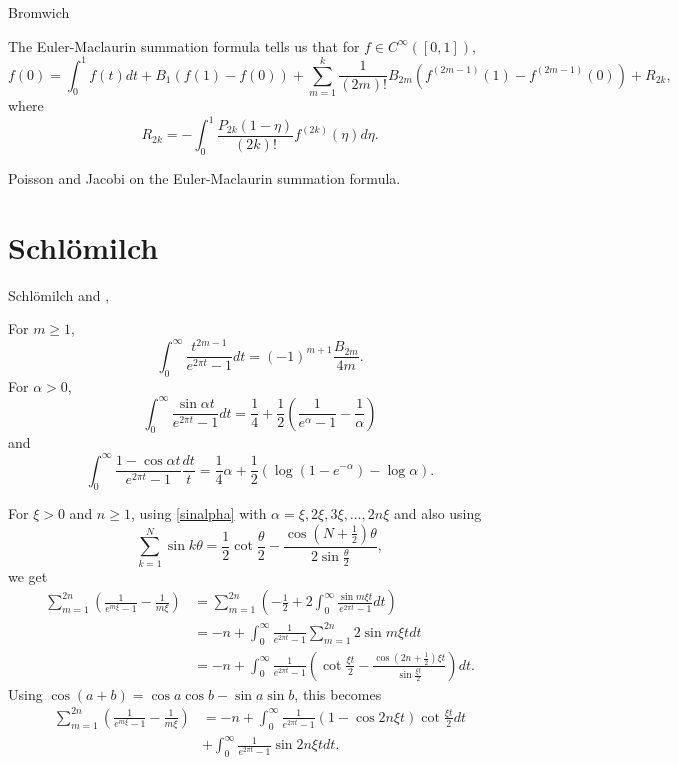 \documentclass{article}
\begin{document}
Bromwich \cite[Chapter~XII]{bromwich}

The Euler-Maclaurin summation formula \cite[p.~280, Ch.~VI, Eq.~35]{bourbaki} tells us that for $f \in C^\infty([0,1])$,
\[
f(0)=\int_0^1 f(t) dt
+B_1(f(1)-f(0))+
\sum_{m=1}^k \frac{1}{(2m)!} B_{2m} ( f^{(2m-1)}(1)-f^{(2m-1)}(0))+R_{2k},
\]
where 
\[
R_{2k} = -\int_0^1 \frac{P_{2k}(1-\eta)}{(2k)!} f^{(2k)}(\eta) d\eta.
\]

Poisson and Jacobi  on the Euler-Maclaurin summation formula.



\section{Schl\"omilch}
Schl\"omilch \cite{schlomilch1861}  and  \cite[p.~238]{compendium}, \cite{schlomilch1863}


For $m \geq 1$,
\begin{equation}
\int_0^\infty \frac{t^{2m-1}}{e^{2\pi t}-1} dt=(-1)^{m+1} \frac{B_{2m}}{4m}.
\label{bernoulliInt}
\end{equation}
For $\alpha>0$,
\begin{equation}
\int_0^\infty \frac{\sin \alpha t}{e^{2\pi t}-1} dt = \frac{1}{4}+\frac{1}{2}\left(\frac{1}{e^\alpha-1}-\frac{1}{\alpha}\right)
\label{sinalpha}
\end{equation}
and
\begin{equation}
\int_0^\infty \frac{1-\cos \alpha t}{e^{2\pi t}-1} \frac{dt}{t} = \frac{1}{4}\alpha+\frac{1}{2}\left(\log(1-e^{-\alpha})-\log \alpha\right).
\label{cosalpha}
\end{equation}

For $\xi>0$ and $n \geq 1$, using \eqref{sinalpha} with $\alpha=\xi,2\xi,3\xi,\ldots,2n\xi$ 
and also using
\[
\sum_{k=1}^N \sin k\theta = \frac{1}{2}\cot \frac{\theta}{2}-\frac{\cos(N+\frac{1}{2})\theta}{2\sin \frac{\theta}{2}},
\]
we get
\begin{align*}
\sum_{m=1}^{2n} \left(\frac{1}{e^{m\xi}-1} -\frac{1}{m\xi} \right)&=\sum_{m=1}^{2n} \left(-\frac{1}{2}+2\int_0^\infty \frac{\sin m\xi t}{e^{2\pi t}-1} dt \right)\\
&=-n + \int_0^\infty \frac{1}{e^{2\pi t}-1} \sum_{m=1}^{2n} 2\sin m\xi t dt\\
&=-n+\int_0^\infty \frac{1}{e^{2\pi t}-1} \left(\cot \frac{\xi t}{2}-\frac{\cos(2n+\frac{1}{2})\xi t}{\sin \frac{\xi t}{2}} \right) dt.
\end{align*}
Using $\cos(a+b)=\cos a \cos b - \sin a \sin b$, this becomes
\begin{align}
\sum_{m=1}^{2n} \left(\frac{1}{e^{m\xi}-1} -\frac{1}{m\xi} \right)&=
-n+\int_0^\infty \frac{1}{e^{2\pi t}-1} (1-\cos 2n\xi t)\cot \frac{\xi t}{2}dt \label{xisum}\\
& +\int_0^\infty \frac{1}{e^{2\pi t}-1}  \sin 2n\xi t dt.
\nonumber
\end{align}
\end{document}

